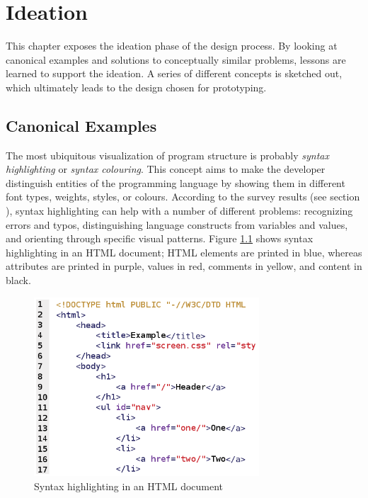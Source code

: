 \chapter{Ideation}\label{ideation}

This chapter exposes the ideation phase of the design process. By
looking at canonical examples and solutions to conceptually similar
problems, lessons are learned to support the ideation. A series of
different concepts is sketched out, which ultimately leads to the design
chosen for prototyping.

\section{Canonical Examples}\label{similar}

The most ubiquitous visualization of program structure is probably
\emph{syntax highlighting} or \emph{syntax colouring}. This concept aims
to make the developer distinguish entities of the programming language
by showing them in different font types, weights, styles, or colours.
According to the survey results (see section
), syntax highlighting can help with a number
of different problems: recognizing errors and typos, distinguishing
language constructs from variables and values, and orienting through
specific visual patterns. Figure \ref{fig:syntaxhighlighting} shows
syntax highlighting in an HTML document; HTML elements are printed in
blue, whereas attributes are printed in purple, values in red, comments
in yellow, and content in black.

\begin{figure}[htbp]
\centering
\includegraphics[keepaspectratio,width=0.75\textwidth]{img/syntax_highlighting.png}
\caption{Syntax highlighting in an HTML document}
\label{fig:syntaxhighlighting}
\end{figure}

